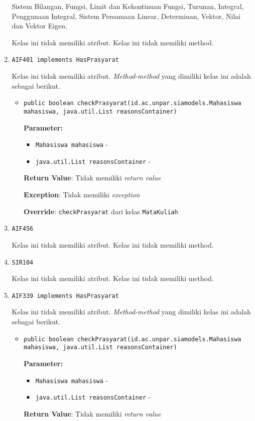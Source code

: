 \documentclass{article}
\begin{document}
\begin{enumerate}
Sistem Bilangan, Fungsi, Limit dan Kekontinuan Fungsi, Turunan, Integral, 
 Penggunaan Integral, Sistem Persamaan Linear, Determinan, Vektor, Nilai dan 
 Vektor Eigen.

Kelas ini tidak memiliki atribut. Kelas ini tidak memiliki method. \item \texttt{AIF401 implements HasPrasyarat}



Kelas ini tidak memiliki atribut. \textit{Method-method} yang dimiliki kelas ini adalah sebagai berikut.
\begin{itemize}
\item \texttt{public boolean checkPrasyarat(id.ac.unpar.siamodels.Mahasiswa mahasiswa, java.util.List reasonsContainer)}

\textbf{Parameter:}
\begin{itemize}
\item \texttt{Mahasiswa mahasiswa} - 
\item \texttt{java.util.List reasonsContainer} - 
\end{itemize}
\textbf{Return Value}: Tidak memiliki \textit{return value}

\textbf{Exception}: Tidak memiliki \textit{exception}

\textbf{Override}: \texttt{checkPrasyarat} dari kelas \texttt{MataKuliah}

\end{itemize}
\item \texttt{AIF456}



Kelas ini tidak memiliki atribut. Kelas ini tidak memiliki method. \item \texttt{SIR104}



Kelas ini tidak memiliki atribut. Kelas ini tidak memiliki method. \item \texttt{AIF339 implements HasPrasyarat}



Kelas ini tidak memiliki atribut. \textit{Method-method} yang dimiliki kelas ini adalah sebagai berikut.
\begin{itemize}
\item \texttt{public boolean checkPrasyarat(id.ac.unpar.siamodels.Mahasiswa mahasiswa, java.util.List reasonsContainer)}

\textbf{Parameter:}
\begin{itemize}
\item \texttt{Mahasiswa mahasiswa} - 
\item \texttt{java.util.List reasonsContainer} - 
\end{itemize}
\textbf{Return Value}: Tidak memiliki \textit{return value}


\end{itemize}
\end{enumerate}
\end{document}
